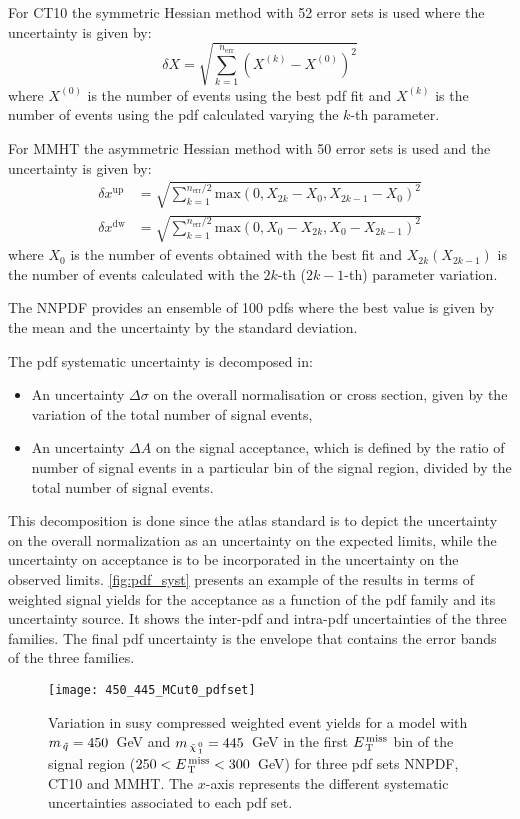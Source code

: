 For CT10 the symmetric Hessian method with 52 error sets is used where the
uncertainty is given by:
\begin{equation}
  \label{eq:119}
  \delta X = \sqrt{\sum_{k = 1}^{n_\mathrm{err}} \left(X^{(k)} -
      X^{(0)} \right)^2}
\end{equation}
where $X^{(0)}$ is the number of events using the best \gls{pdf} fit and
$X^{(k)}$ is the number of events using the \gls{pdf} calculated varying the
$k$-th parameter.

For MMHT the asymmetric Hessian method with 50 error sets is used and the
uncertainty is given by:
\begin{align}
  \label{eq:120}
  \delta x^{\mathrm{up}} & = \sqrt{\sum_{k = 1}^{n_\mathrm{err}/2}
                           \mathrm{max}(0, X_{2k} - X_0, X_{2k - 1} - X_0)^2} \\
  \delta x^{\mathrm{dw}} & = \sqrt{\sum_{k = 1}^{n_\mathrm{err}/2}
                           \mathrm{max}(0, X_0 - X_{2k}, X_0 - X_{2k - 1})^2}
\end{align}
where $X_0$ is the number of events obtained with the best fit and $X_{2k}
(X_{2k -1})$ is the number of events calculated with the $2k$-th ($2k -1$-th)
parameter variation.

The NNPDF provides an ensemble of 100 \glspl{pdf} where the best value is given
by the mean and the uncertainty by the standard deviation.

The \gls{pdf} systematic uncertainty is decomposed in:
\begin{itemize}
\item An uncertainty $\Delta \sigma$ on the overall normalisation or cross
  section, given by the variation of the total number of signal events,
\item An uncertainty $\Delta A$ on the signal acceptance, which is defined by
  the ratio of number of signal events in a particular bin of the signal region,
  divided by the total number of signal events.
\end{itemize}
This decomposition is done since the \gls{atlas} standard is to depict the
uncertainty on the overall normalization as an uncertainty on the expected
limits, while the uncertainty on acceptance is to be incorporated in the
uncertainty on the observed limits. \cref{fig:pdf_syst} presents an example of
the results in terms of weighted signal yields for the acceptance as a function
of the \gls{pdf} family and its uncertainty source. It shows the inter-\gls{pdf}
and intra-\gls{pdf} uncertainties of the three families. The final \gls{pdf}
uncertainty is the envelope that contains the error bands of the three families.
\begin{figure}[!h]
\centering
\texttt{[image: 450\_445\_MCut0\_pdfset]}
\caption{Variation in \gls{susy} compressed weighted event yields for a model
  with $m_{\, \tilde{q}} = 450$~GeV and $m_{\, \tilde{\chi}_{\, 1}^{\, 0}} = 445$~GeV in the first $E_\mathrm{\, T}^\mathrm{\, miss}$ bin
  of the signal region ($250 < E_\mathrm{\, T}^\mathrm{\, miss} < 300$~GeV) for three \gls{pdf} sets NNPDF,
  CT10 and MMHT. The $x$-axis represents the different systematic uncertainties
  associated to each \gls{pdf} set.}
\label{fig:susy_pdfsysts}
\end{figure}

